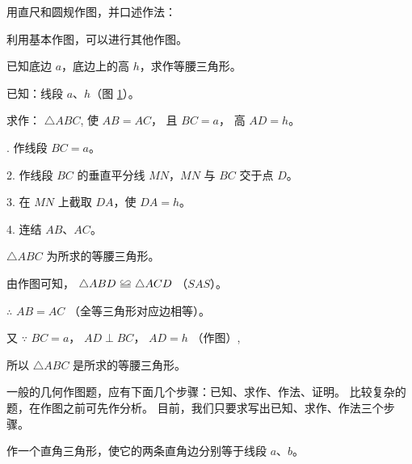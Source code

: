 \begin{lianxi}

用直尺和圆规作图，并口述作法：



\end{lianxi}



利用基本作图，可以进行其他作图。

\liti[0] 已知底边 $a$，底边上的高 $h$，求作等腰三角形。

已知：线段 $a$、$h$（图 \ref{fig:czjh1-3-47}）。

\begin{figure}[htbp]
  \centering
  
  \caption{}\label{fig:czjh1-3-47}
\end{figure}

求作： $\triangle ABC$, 使 $AB = AC$， 且 $BC = a$， 高 $AD = h$。

. 作线段 $BC = a$。

2. 作线段 $BC$ 的垂直平分线 $MN$，$MN$ 与 $BC$ 交于点 $D$。

3. 在 $MN$ 上截取 $DA$，使 $DA = h$。

4. 连结 $AB$、$AC$。

$\triangle ABC$ 为所求的等腰三角形。

\zhengming 由作图可知， $\triangle ABD \quandeng \triangle ACD$ （$SAS$）。

$\therefore$  \quad $AB = AC$ （全等三角形对应边相等）。

又 $\because$ \quad $BC = a$， $AD \perp BC$， $AD = h$ （作图）,

所以 $\triangle ABC$ 是所求的等腰三角形。

一般的几何作图题，应有下面几个步骤：已知、求作、作法、证明。
比较复杂的题，在作图之前可先作分析。
目前，我们只要求写出已知、求作、作法三个步骤。

\begin{lianxi}

作一个直角三角形，使它的两条直角边分别等于线段 $a$、$b$。

\begin{figure}[htbp]
  \centering
  
\end{figure}

\end{lianxi}

